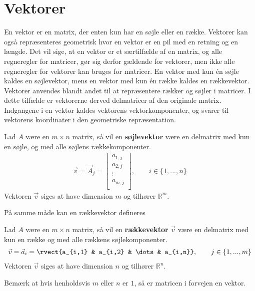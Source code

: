 \section{Vektorer}
En vektor er en matrix, der enten kun har en søjle eller en række. Vektorer kan også repræsenteres geometrisk hvor en vektor er en pil med en retning og en længde.
Det vil sige, at en vektor er et særtilfælde af en matrix, og alle regneregler for matricer, gør sig derfor gældende for vektorer, men ikke alle regneregler for vektorer kan bruges for matricer.
En vektor med kun én søjle kaldes en søjlevektor, mens en vektor med kun én række kaldes en rækkevektor.
Vektorer anvendes blandt andet til at repræsentere rækker og søjler i matricer. 
I dette tilfælde er vektorerne derved delmatricer af den originale matrix.
Indgangene i en vektor kaldes vektorens vektorkomponenter, og svarer til vektorens koordinater i den geometriske repræsentation.

\begin{defn}[Søjlevektor]
Lad $A$ være en $m \times n$ matrix, så vil en \textbf{søjlevektor} være en delmatrix med kun en søjle, og med alle søjlens rækkekomponenter.
\begin{align*}
\vec{v}=\vec{A}_j = 
\begin{bmatrix}
a_{1,j}\\
a_{2,j}\\
\vdots \\
a_{m,j} \\
\end{bmatrix},\qquad  i\in \{1,...,n\}
\end{align*}
Vektoren $\vec{v}$ siges at have dimension $m$ og tilhører  $\mathds{R}^m$.
\end{defn}

På samme måde kan en rækkevektor defineres


\begin{defn}[Rækkevektor]
Lad $A$ være en $m \times n$ matrix, så vil en \textbf{rækkevektor} $\vec{v}$ være en delmatrix med kun en række og med alle rækkens søjlekomponenter.
\begin{align*}
\vec{v}=\vec{a}_i = 
\rvect{a_{i,1} & a_{i,2} & \dots & a_{i,n}},
\qquad  j\in \{1,...,m\}
\end{align*}
Vektoren $\vec{v}$ siges at have dimension $n$ og tilhører $\mathds{R}^n$.
\end{defn}
Bemærk at hvis henholdsvis $m$ eller $n$ er $1$, så er matricen i forvejen en vektor.\\

